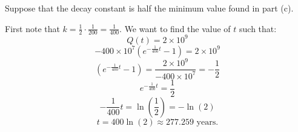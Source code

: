 \documentclass[nooutcomes]{ximera}
\renewenvironment{freeResponse}{
\ifhandout\setbox0\vbox\bgroup\else
\begin{trivlist}\item[\hskip \labelsep\bfseries Solution:\hspace{2ex}]
\fi}
{\ifhandout\egroup\else
\end{trivlist}
\fi}
\begin{document}
\begin{problem}
\begin{enumerate}
	\item  Suppose that the decay constant is half the minimum value found in part (c).

		\begin{freeResponse}
		First note that $k = \frac{1}{2} \cdot \frac{1}{200} = \frac{1}{400}$.
		We want to find the value of $t$ such that:
			\begin{equation*}
			Q(t) = 2 \times 10^9
			\end{equation*}
			\begin{equation*}
			- 400 \times 10^7 \left(e^{-\frac{1}{400}t}-1 \right) = 2 \times 10^9
			\end{equation*}
			\begin{equation*}
			\left(e^{-\frac{1}{400}t}-1 \right) = \frac{2 \times 10^9}{-400 \times 10^7} = - \frac{1}{2}
			\end{equation*}
			\begin{equation*}
			e^{-\frac{1}{400}t} = \frac{1}{2}
			\end{equation*}
			\begin{equation*}
			-\frac{1}{400}t=\ln \left(\frac{1}{2} \right) = -\ln(2)
			\end{equation*}
			\begin{equation*}
			t = 400 \ln(2) \approx 277.259 \text{ years}.
			\end{equation*}
		\end{freeResponse}
	\end{enumerate}
\end{problem}
\end{document}
